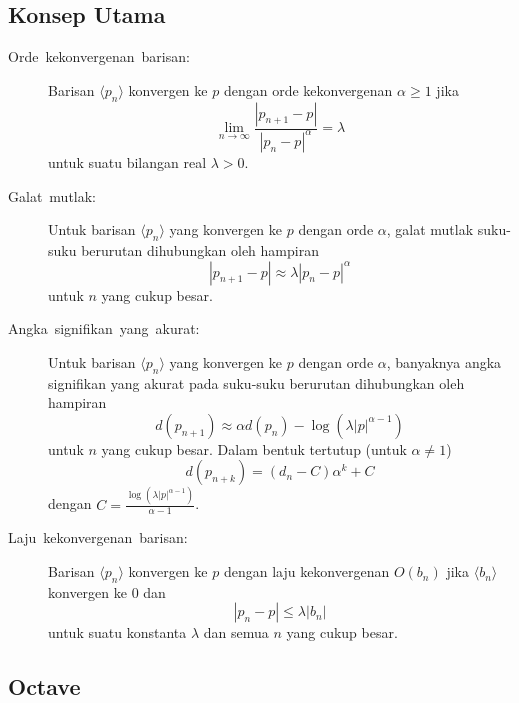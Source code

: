 \subsection{Konsep Utama}
\begin{description}
\item [{Orde~kekonvergenan~barisan:}] Barisan
$\langle p_{n}\rangle$ konvergen ke $p$ dengan orde kekonvergenan
$\alpha\geq1$ jika
\[
\lim_{n\to\infty}\frac{\left|p_{n+1}-p\right|}{\left|p_{n}-p\right|^{\alpha}}=\lambda
\]
untuk suatu bilangan real $\lambda>0$. 
\item [{Galat~mutlak:}] Untuk barisan $\langle p_{n}\rangle$ yang konvergen
ke $p$ dengan orde $\alpha$, galat mutlak suku-suku berurutan dihubungkan
oleh hampiran
\[
|p_{n+1}-p|\approx\lambda|p_{n}-p|^{\alpha}
\]
untuk $n$ yang cukup besar.
\item [{Angka~signifikan~yang~akurat:}] Untuk
barisan $\langle p_{n}\rangle$ yang konvergen ke $p$ dengan orde
$\alpha$, banyaknya angka signifikan yang akurat pada suku-suku berurutan
dihubungkan oleh hampiran
\[
d(p_{n+1})\approx\alpha d(p_{n})-\log\left(\lambda|p|^{\alpha-1}\right)
\]
untuk $n$ yang cukup besar. Dalam bentuk tertutup (untuk $\alpha\neq1$)
\[
d(p_{n+k})=(d_{n}-C)\alpha^{k}+C
\]
dengan ${\displaystyle C=\frac{\log\left(\lambda|p|^{\alpha-1}\right)}{\alpha-1}}$.
\item [{Laju~kekonvergenan~barisan:}] Barisan
$\langle p_{n}\rangle$ konvergen ke $p$ dengan laju kekonvergenan
$O(b_{n})$ jika $\langle b_{n}\rangle$ konvergen ke 0 dan 
\[
|p_{n}-p|\leq\lambda|b_{n}|
\]
untuk suatu konstanta $\lambda$ dan semua $n$ yang cukup besar.
\end{description}

\subsection{Octave}

